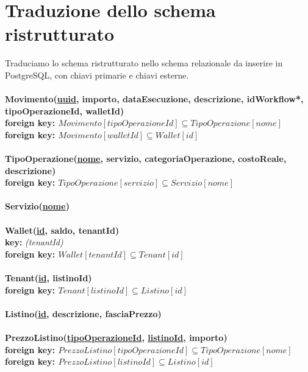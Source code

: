 \section{Traduzione dello schema ristrutturato}
Traduciamo lo schema ristrutturato nello schema relazionale da inserire in PostgreSQL, con chiavi primarie e chiavi esterne.
\\\\
\textbf{Movimento(\underline{uuid}, importo, dataEsecuzione, descrizione, idWorkflow*,\\ tipoOperazioneId, walletId) \\}
\textbf{\hspace*{1.5 cm} foreign key: $ Movimento[tipoOperazioneId] \subseteq TipoOperazione[nome] $} \\
\textbf{\hspace*{1.5 cm} foreign key: $ Movimento[walletId] \subseteq Wallet[id] $ }
\\\\
\textbf{TipoOperazione(\underline{nome}, servizio, categoriaOperazione, costoReale, \\descrizione) \\}
\textbf{\hspace*{1.5 cm} foreign key: $ TipoOperazione[servizio] \subseteq Servizio[nome] $}
\\\\
\textbf{Servizio(\underline{nome})}
\\\\
\textbf{Wallet(\underline{id}, saldo, tenantId) \\}
\textbf{\hspace*{1.5 cm} key:} \textit{(tenantId)} \\
\textbf{\hspace*{1.5 cm} foreign key: $ Wallet[tenantId] \subseteq Tenant[id] $}
\\\\
\textbf{Tenant(\underline{id}, listinoId) \\}
\textbf{\hspace*{1.5 cm} foreign key: $ Tenant[listinoId] \subseteq Listino[id] $}
\\\\
\textbf{Listino(\underline{id}, descrizione, fasciaPrezzo)}
\\\\
\textbf{PrezzoListino(\underline{tipoOperazioneId}, \underline{listinoId}, importo) \\}
\textbf{\hspace*{1.5 cm} foreign key: $ PrezzoListino[tipoOperazioneId] \subseteq TipoOperazione[nome] $} \\
\textbf{\hspace*{1.5 cm} foreign key: $ PrezzoListino[listinoId] \subseteq Listino[id] $}

